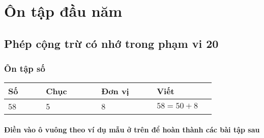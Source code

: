 \documentclass[Main.tex]{subfiles}
\newenvironment{vidu}[1][\mycolor]{
	\begin{hopvidu}[#1]
	\par\noindent\indam[#1]{Ví dụ:}
	}{\end{hopvidu}}
\begin{document}
\setcounter{secnumdepth}{4} %
\titlespacing*{\subsubsection}{0cm}{0pt}{0pt}
\titlespacing*{\paragraph}{0cm}{0pt}{0pt}
\chapter{Ôn tập đầu năm}
\section{Phép cộng trừ có nhớ trong phạm vi 20}
\subsection{Ôn tập số}
\begin{vidu}
	\begin{center}
		\begin{tabular}{|C{0.15\linewidth}|*{3}{C{0.22\linewidth}|}}
			\hline \textbf{Số} & \textbf{Chục} & \textbf{Đơn vị} & \textbf{Viết} \\
			 & 5 & 8 & $58=50+8$ \\
			\hline
		\end{tabular}
	\end{center}
\end{vidu}
\subsubsection{Điền vào ô vuông theo ví dụ mẫu ở trên để hoàn thành các bài tập sau}
\end{document}
